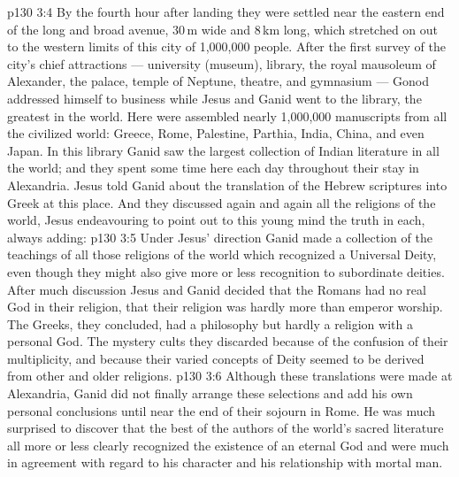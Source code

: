 \vs p130 3:4 \pc By the fourth hour after landing they were settled near the eastern end of the long and broad avenue, 30\,m wide and 8\,km long, which stretched on out to the western limits of this city of 1,000,000 people. After the first survey of the city’s chief attractions --- university (museum), library, the royal mausoleum of Alexander, the palace, temple of Neptune, theatre, and gymnasium --- Gonod addressed himself to business while Jesus and Ganid went to the library, the greatest in the world. Here were assembled nearly 1,000,000 manuscripts from all the civilized world: Greece, Rome, Palestine, Parthia, India, China, and even Japan. In this library Ganid saw the largest collection of Indian literature in all the world; and they spent some time here each day throughout their stay in Alexandria. Jesus told Ganid about the translation of the Hebrew scriptures into Greek at this place. And they discussed again and again all the religions of the world, Jesus endeavouring to point out to this young mind the truth in each, always adding: 
\vs p130 3:5 \pc Under Jesus’ direction Ganid made a collection of the teachings of all those religions of the world which recognized a Universal Deity, even though they might also give more or less recognition to subordinate deities. After much discussion Jesus and Ganid decided that the Romans had no real God in their religion, that their religion was hardly more than emperor worship. The Greeks, they concluded, had a philosophy but hardly a religion with a personal God. The mystery cults they discarded because of the confusion of their multiplicity, and because their varied concepts of Deity seemed to be derived from other and older religions.
\vs p130 3:6 Although these translations were made at Alexandria, Ganid did not finally arrange these selections and add his own personal conclusions until near the end of their sojourn in Rome. He was much surprised to discover that the best of the authors of the world’s sacred literature all more or less clearly recognized the existence of an eternal God and were much in agreement with regard to his character and his relationship with mortal man.
